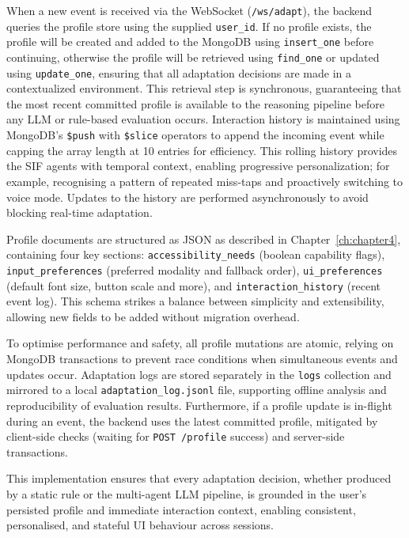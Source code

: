 When a new event is received via the WebSocket (\texttt{/ws/adapt}), the backend queries the profile store using the supplied \texttt{user\_id}. If no profile exists, the profile will be created and added to the MongoDB using \texttt{insert\_one} before continuing, otherwise the profile will be retrieved using \texttt{find\_one} or updated using \texttt{update\_one}, ensuring that all adaptation decisions are made in a contextualized environment. This retrieval step is synchronous, guaranteeing that the most recent committed profile is available to the reasoning pipeline before any LLM or rule-based evaluation occurs. Interaction history is maintained using MongoDB’s \texttt{\$push} with \texttt{\$slice} operators to append the incoming event while capping the array length at 10 entries for efficiency. This rolling history provides the SIF agents with temporal context, enabling progressive personalization; for example, recognising a pattern of repeated miss-taps and proactively switching to voice mode. Updates to the history are performed asynchronously to avoid blocking real-time adaptation.

Profile documents are structured as JSON as described in Chapter~\ref{ch:chapter4}, containing four key sections: \texttt{accessibility\_needs} (boolean capability flags), \texttt{input\_preferences} (preferred modality and fallback order), \texttt{ui\_preferences} (default font size, button scale and more), and \texttt{interaction\_history} (recent event log). This schema strikes a balance between simplicity and extensibility, allowing new fields to be added without migration overhead.

To optimise performance and safety, all profile mutations are atomic, relying on MongoDB transactions to prevent race conditions when simultaneous events and updates occur. Adaptation logs are stored separately in the \texttt{logs} collection and mirrored to a local \texttt{adaptation\_log.jsonl} file, supporting offline analysis and reproducibility of evaluation results. Furthermore, if a profile update is in-flight during an event, the backend uses the latest committed profile, mitigated by client-side checks (waiting for \texttt{POST /profile} success) and server-side transactions.

This implementation ensures that every adaptation decision, whether produced by a static rule or the multi-agent LLM pipeline, is grounded in the user’s persisted profile and immediate interaction context, enabling consistent, personalised, and stateful UI behaviour across sessions.

